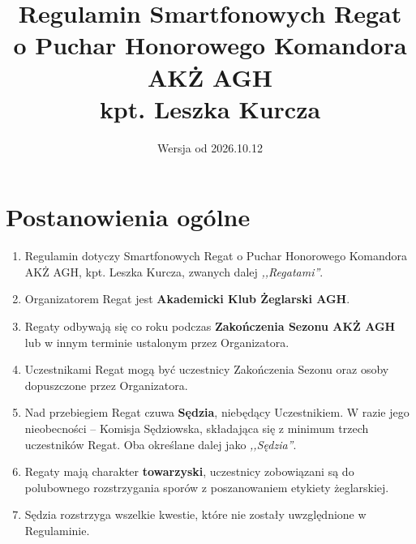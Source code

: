 \documentclass[12pt,a4paper]{article}
\title{\huge Regulamin \textbf{Smartfonowych Regat}\\
\Large o Puchar Honorowego Komandora AKŻ AGH\\
kpt. Leszka Kurcza}
\date{Wersja od 2026.10.12}
\author{}
\begin{document}
\maketitle



\section{Postanowienia ogólne}
\begin{enumerate}
    \item Regulamin dotyczy Smartfonowych Regat o Puchar Honorowego Komandora AKŻ AGH, kpt. Leszka Kurcza, zwanych dalej \textit{,,Regatami''}.
    \item Organizatorem Regat jest \textbf{Akademicki Klub Żeglarski AGH}.
    \item Regaty odbywają się co roku podczas \textbf{Zakończenia Sezonu AKŻ AGH} lub w innym terminie ustalonym przez Organizatora.
    \item Uczestnikami Regat mogą być uczestnicy Zakończenia Sezonu oraz osoby dopuszczone przez Organizatora.
    \item Nad przebiegiem Regat czuwa \textbf{Sędzia}, niebędący Uczestnikiem.
    W razie jego nieobecności -- Komisja Sędziowska, składająca się z minimum trzech uczestników Regat. Oba określane dalej jako \textit{,,Sędzia''}.
    \item Regaty mają charakter \textbf{towarzyski}, uczestnicy zobowiązani są do polubownego rozstrzygania sporów z poszanowaniem etykiety żeglarskiej.
    \item Sędzia rozstrzyga wszelkie kwestie, które nie zostały uwzględnione w Regulaminie.
\end{enumerate}
\end{document}
